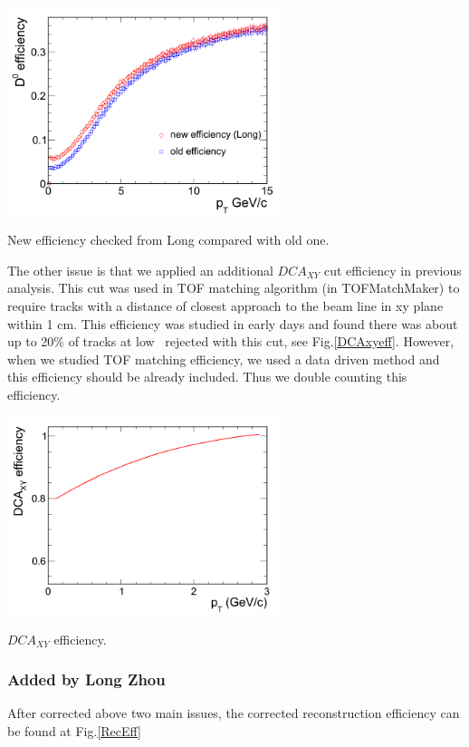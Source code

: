 \bfg \centering
\includegraphics[width=0.6\textwidth]{figure/Run11_YF/eff.png}
\caption{New efficiency checked from Long compared with old one.}
\label{effnew}
\efg

The other issue is that we applied an additional $DCA_{XY}$ cut efficiency in previous analysis. This cut was used in TOF matching algorithm (in TOFMatchMaker) to require tracks with a distance of closest approach to the beam line in xy plane within 1 cm. This efficiency was studied in early days and found there was about up to 20\% of tracks at low \pt\ rejected with this cut, see Fig.\ref{DCAxyeff}. However, when we studied TOF matching efficiency, we used a data driven method and this efficiency should be already included. Thus we double counting this efficiency.

\bfg \centering
\includegraphics[width=0.6\textwidth]{figure/Run11_YF/DCAxyEff.png}
\caption{$DCA_{XY}$ efficiency.}
\label{DCAxyeff}
\efg

\subsubsection{Added by Long Zhou}
After corrected above two main issues, the corrected reconstruction efficiency can be found at Fig.\ref{RecEff}

